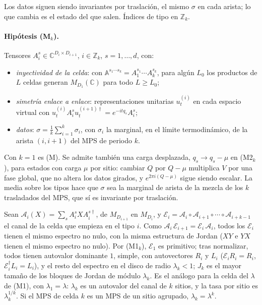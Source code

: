 \documentclass[11pt,a4paper]{article}
\theoremstyle{remark}
\begin{document}
Los datos siguen siendo invariantes por traslación, el mismo $\sigma$ en cada arista; lo que
cambia es el estado del que salen. Índices de tipo en $\mathbb Z_k$.

\paragraph{Hipótesis (M$_k$).} Tensores $A_i^s\in\mathbb C^{D_i\times D_{i+1}}$, $i\in\mathbb Z_k$,
$s=1,\dots,d$, con:
\begin{itemize}
\item[(M1$_k$)] \emph{inyectividad de la celda}: con $\mathbb A^{s_1\cdots s_k}=A_1^{s_1}\cdots
  A_k^{s_k}$, para algún $L_0$ los productos de $L$ celdas generan $M_{D_1}(\mathbb C)$ para todo
  $L\ge L_0$;
\item[(M2$_k$)] \emph{simetría enlace a enlace}: representaciones unitarias $u^{(i)}_t$ en cada
  espacio virtual con $u^{(i)}_tA_i^su^{(i+1)\dagger}_t=e^{-itq_s}A_i^s$;
\item[(M3$_k$)] \emph{datos}: $\sigma=\tfrac1k\sum_{i=1}^k\sigma_i$, con $\sigma_i$ la marginal, en
  el límite termodinámico, de la arista $(i,i{+}1)$ del MPS de periodo $k$.
\end{itemize}
Con $k=1$ es (M). Se admite también una carga desplazada, $q_s\to q_s-\mu$ en (M2$_k$), para
estados con carga $\mu$ por sitio: cambiar $Q$ por $Q-\mu$ multiplica $V$ por una fase global,
que no altera los datos girados, y $e^{2\pi i(Q-\mu)}$ sigue siendo escalar. La media sobre los tipos hace que $\sigma$ sea la marginal de arista de la mezcla
de los $k$ trasladados del MPS, que sí es invariante por traslación.

Sean $\mathcal A_i(X)=\sum_sA_i^sXA_i^{s\dagger}$, de $M_{D_{i+1}}$ en $M_{D_i}$, y
$\mathcal E_i=\mathcal A_i\circ\mathcal A_{i+1}\circ\cdots\circ\mathcal A_{i+k-1}$ el canal de la
celda que empieza en el tipo $i$. Como $\mathcal A_i\,\mathcal E_{i+1}=\mathcal E_i\,\mathcal A_i$,
todos los $\mathcal E_i$ tienen el mismo espectro no nulo, con la misma estructura de Jordan
($XY$ e $YX$ tienen el mismo espectro no nulo). Por (M1$_k$), $\mathcal E_1$ es primitivo; tras normalizar, todos tienen autovalor
dominante $1$, simple, con autovectores $R_i$ y $L_i$ ($\mathcal E_iR_i=R_i$,
$\mathcal E_i^\dagger L_i=L_i$), y el resto del espectro en el disco
de radio $\lambda_k<1$; $J_k$ es el mayor tamaño de los bloques de Jordan de módulo $\lambda_k$. Es el análogo para la celda del $\lambda$ de (M1), con $\lambda_1=\lambda$:
$\lambda_k$ es un autovalor del canal de $k$ sitios, y la tasa por sitio es $\lambda_k^{1/k}$. Si
el MPS de celda $k$ es un MPS de un sitio agrupado, $\lambda_k=\lambda^k$.
\end{document}
